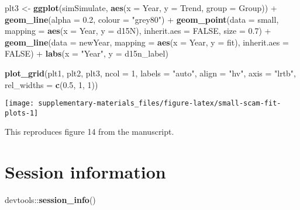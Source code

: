\documentclass[12pt,]{article}
\newenvironment{Shaded}{\begin{snugshade}}{\end{snugshade}}
\newcommand{\KeywordTok}[1]{\textcolor[rgb]{0.13,0.29,0.53}{\textbf{{#1}}}}
\newcommand{\DataTypeTok}[1]{\textcolor[rgb]{0.13,0.29,0.53}{{#1}}}
\newcommand{\DecValTok}[1]{\textcolor[rgb]{0.00,0.00,0.81}{{#1}}}
\newcommand{\FloatTok}[1]{\textcolor[rgb]{0.00,0.00,0.81}{{#1}}}
\newcommand{\StringTok}[1]{\textcolor[rgb]{0.31,0.60,0.02}{{#1}}}
\newcommand{\OtherTok}[1]{\textcolor[rgb]{0.56,0.35,0.01}{{#1}}}
\newcommand{\NormalTok}[1]{{#1}}
\begin{document}
\begin{Shaded}
\begin{Highlighting}[]
\NormalTok{plt3 <-}\StringTok{ }\KeywordTok{ggplot}\NormalTok{(simSimulate, }\KeywordTok{aes}\NormalTok{(}\DataTypeTok{x =} \NormalTok{Year, }\DataTypeTok{y =} \NormalTok{Trend, }\DataTypeTok{group =} \NormalTok{Group)) +}
\StringTok{    }\KeywordTok{geom_line}\NormalTok{(}\DataTypeTok{alpha =} \FloatTok{0.2}\NormalTok{, }\DataTypeTok{colour =} \StringTok{"grey80"}\NormalTok{) +}
\StringTok{    }\KeywordTok{geom_point}\NormalTok{(}\DataTypeTok{data =} \NormalTok{small,}
               \DataTypeTok{mapping =} \KeywordTok{aes}\NormalTok{(}\DataTypeTok{x =} \NormalTok{Year, }\DataTypeTok{y =} \NormalTok{d15N),}
               \DataTypeTok{inherit.aes =} \OtherTok{FALSE}\NormalTok{,}
               \DataTypeTok{size =} \FloatTok{0.7}\NormalTok{) +}
\StringTok{    }\KeywordTok{geom_line}\NormalTok{(}\DataTypeTok{data =} \NormalTok{newYear,}
              \DataTypeTok{mapping =} \KeywordTok{aes}\NormalTok{(}\DataTypeTok{x =} \NormalTok{Year, }\DataTypeTok{y =} \NormalTok{fit),}
              \DataTypeTok{inherit.aes =} \OtherTok{FALSE}\NormalTok{) +}
\StringTok{    }\KeywordTok{labs}\NormalTok{(}\DataTypeTok{x =} \StringTok{"Year"}\NormalTok{, }\DataTypeTok{y =} \NormalTok{d15n_label)}

\KeywordTok{plot_grid}\NormalTok{(plt1, plt2, plt3, }\DataTypeTok{ncol =} \DecValTok{1}\NormalTok{, }\DataTypeTok{labels =} \StringTok{"auto"}\NormalTok{, }\DataTypeTok{align =} \StringTok{"hv"}\NormalTok{,}
          \DataTypeTok{axis =} \StringTok{"lrtb"}\NormalTok{, }\DataTypeTok{rel_widths =} \KeywordTok{c}\NormalTok{(}\FloatTok{0.5}\NormalTok{, }\DecValTok{1}\NormalTok{, }\DecValTok{1}\NormalTok{))}
\end{Highlighting}
\end{Shaded}

\begin{center}\texttt{[image: supplementary-materials\_files/figure-latex/small-scam-fit-plots-1]} \end{center}

This reproduces figure 14 from the manuscript.

\section{Session information}\label{session-information}

\begin{Shaded}
\begin{Highlighting}[]
\NormalTok{devtools::}\KeywordTok{session_info}\NormalTok{()}
\end{Highlighting}
\end{Shaded}
\end{document}
